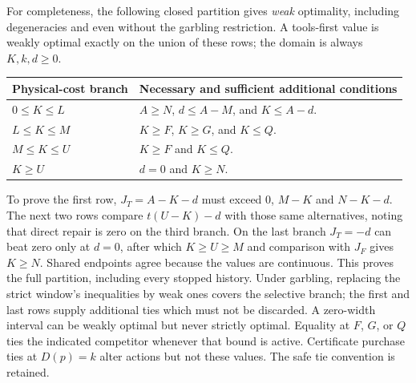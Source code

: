 \documentclass[11pt]{article}
\begin{document}
For completeness, the following closed partition gives \emph{weak} optimality, including degeneracies and even without the garbling restriction. A tools-first value is weakly optimal exactly on the union of these rows; the domain is always $K,k,d\geq0$.
\begin{center}\small
\begin{tabular}{p{.20\linewidth}p{.70\linewidth}}
\toprule Physical-cost branch & Necessary and sufficient additional conditions\\\midrule
$0\leq K\leq L$ & $A\geq N$, $d\leq A-M$, and $K\leq A-d$.\\
$L\leq K\leq M$ & $K\geq F$, $K\geq G$, and $K\leq Q$.\\
$M\leq K\leq U$ & $K\geq F$ and $K\leq Q$.\\
$K\geq U$ & $d=0$ and $K\geq N$.\\\bottomrule
\end{tabular}
\end{center}
To prove the first row, $J_T=A-K-d$ must exceed $0$, $M-K$ and $N-K-d$. The next two rows compare $t(U-K)-d$ with those same alternatives, noting that direct repair is zero on the third branch. On the last branch $J_T=-d$ can beat zero only at $d=0$, after which $K\geq U\geq M$ and comparison with $J_F$ gives $K\geq N$. Shared endpoints agree because the values are continuous. This proves the full partition, including every stopped history. Under garbling, replacing the strict window's inequalities by weak ones covers the selective branch; the first and last rows supply additional ties which must not be discarded. A zero-width interval can be weakly optimal but never strictly optimal. Equality at $F$, $G$, or $Q$ ties the indicated competitor whenever that bound is active. Certificate purchase ties at $D(p)=k$ alter actions but not these values. The safe tie convention is retained.
\end{document}
